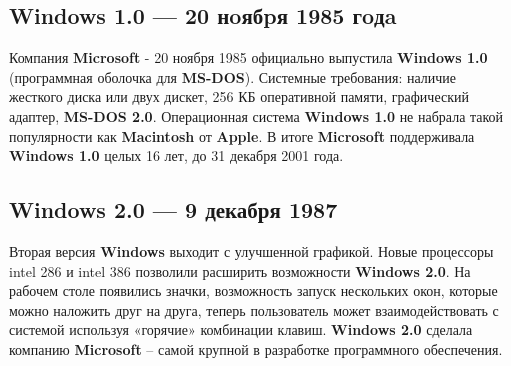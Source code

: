 \documentclass[14pt, a4paper]{article}
\begin{document}
\begin{centering}
    \subsection*{Windows 1.0 — 20 нoябpя 1985 гoдa}
\end{centering}


Компания \textbf{Microsoft} - 20 ноября 1985 официально выпустила \linebreak[4]\textbf{Windows 1.0}
(программная оболочка для \textbf{MS-DOS}).
Системные требования: наличие жесткого диска или двух дискет, 256 КБ оперативной памяти,
графический адаптер, \textbf{MS-DOS 2.0}.
Операционная система \textbf{Windows 1.0} не набрала такой популярности как \textbf{Macintosh} от \textbf{Apple}.
В итоге \textbf{Microsoft} поддерживала \textbf{Windows 1.0} целых 16 лет, до 31 декабря 2001 года.\newpage


\begin{centering}
    \subsection*{Windows 2.0 — 9 декабря 1987}
\end{centering}

Вторая версия \textbf{Windows} выходит с улучшенной графикой. Новые процессоры intel 286 и
intel 386 позволили расширить возможности \textbf{Windows 2.0}.
На рабочем столе появились значки, возможность запуск нескольких окон, которые можно наложить друг на друга,
теперь пользователь может взаимодействовать с системой используя «горячие» комбинации клавиш.
\textbf{Windows 2.0} сделала компанию \textbf{Microsoft} – самой крупной в разработке программного обеспечения.

\begin{figure}[h]%
    \centering
    \label{framework} %
\end{figure}\newpage
\end{document}
